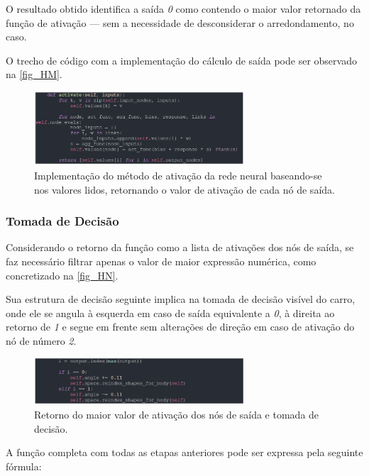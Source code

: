 O resultado obtido identifica a saída \textit{0} como contendo o maior valor retornado da função de ativação —
sem a necessidade de desconsiderar o arredondamento, no caso.

O trecho de código com a implementação do cálculo de saída pode ser observado na \autoref{fig_HM}.

\begin{figure}[htb]
        \centering
        \caption{\label{fig_HM}Implementação do método de ativação da rede neural baseando-se nos valores lidos, retornando o valor de ativação de cada nó de saída.}
        \includegraphics[width=0.7\textwidth]{images/HM.png}
\end{figure}

\subsubsection{Tomada de Decisão}
Considerando o retorno da função como a lista de ativações dos nós de saída, se faz necessário filtrar
apenas o valor de maior expressão numérica, como concretizado na \autoref{fig_HN}.

Sua estrutura de decisão seguinte implica na tomada de decisão visível do carro, onde ele se angula
à esquerda em caso de saída equivalente a \textit{0}, à direita ao retorno de \textit{1} e segue em frente sem alterações
de direção em caso de ativação do nó de número \textit{2}.

\begin{figure}[htb]
        \centering
        \caption{\label{fig_HN}Retorno do maior valor de ativação dos nós de saída e tomada de decisão.}
        \includegraphics[width=0.7\textwidth]{images/HN.png}
\end{figure}

A função completa com todas as etapas anteriores pode ser expressa pela seguinte fórmula:

